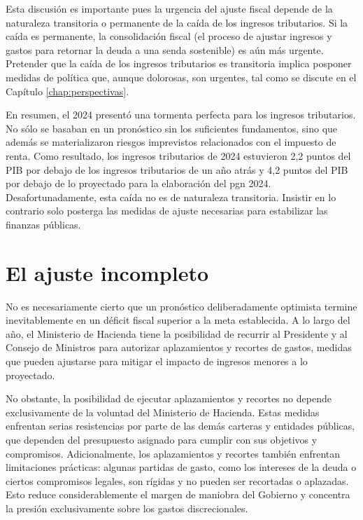Esta discusión es importante pues la urgencia del ajuste fiscal depende de la naturaleza transitoria o permanente de la caída de los ingresos tributarios. Si la caída es permanente, la consolidación fiscal (el proceso de ajustar ingresos y gastos para retornar la deuda a una senda sostenible) es aún más urgente. Pretender que la caída de los ingresos tributarios es transitoria implica posponer medidas de política que, aunque dolorosas, son urgentes, tal como se discute en el Capítulo \ref{chap:perspectivas}.

En resumen, el 2024 presentó una tormenta perfecta para los ingresos tributarios. No sólo se basaban en un pronóstico sin los suficientes fundamentos, sino que además se materializaron riesgos imprevistos relacionados con el impuesto de renta. Como resultado, los ingresos tributarios de 2024 estuvieron 2,2 puntos del PIB por debajo de los ingresos tributarios de un año atrás y 4,2 puntos del PIB por debajo de lo proyectado para la elaboración del \gls{pgn} 2024. Desafortunadamente, esta caída no es de naturaleza transitoria. Insistir en lo contrario solo posterga las medidas de ajuste necesarias para estabilizar las finanzas públicas.

\section{El ajuste incompleto}

No es necesariamente cierto que un pronóstico deliberadamente optimista termine inevitablemente en un déficit fiscal superior a la meta establecida. A lo largo del año, el Ministerio de Hacienda tiene la posibilidad de recurrir al Presidente y al Consejo de Ministros para autorizar aplazamientos y recortes de gastos, medidas que pueden ajustarse para mitigar el impacto de ingresos menores a lo proyectado.

No obstante, la posibilidad de ejecutar aplazamientos y recortes no depende exclusivamente de la voluntad del Ministerio de Hacienda. Estas medidas enfrentan serias resistencias por parte de las demás carteras y entidades públicas, que dependen del presupuesto asignado para cumplir con sus objetivos y compromisos. Adicionalmente, los aplazamientos y recortes también enfrentan limitaciones prácticas: algunas partidas de gasto, como los intereses de la deuda o ciertos compromisos legales, son rígidas y no pueden ser recortadas o aplazadas. Esto reduce considerablemente el margen de maniobra del Gobierno y concentra la presión exclusivamente sobre los gastos discrecionales. 

